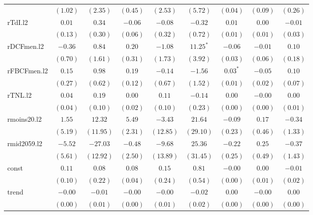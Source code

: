 \documentclass[11pt,]{article}
\begin{document}
\begin{table}[!htbp]
\begin{center}
\begin{tabular}{l c c c c c c c c }
            & $(1.02)$ & $(2.35)$    & $(0.45)$ & $(2.53)$  & $(5.72)$     & $(0.04)$    & $(0.09)$ & $(0.26)$ \\
rTdI.l2     & $0.01$   & $0.34$      & $-0.06$  & $-0.08$   & $-0.32$      & $0.01$      & $0.00$   & $-0.01$  \\
            & $(0.13)$ & $(0.30)$    & $(0.06)$ & $(0.32)$  & $(0.72)$     & $(0.01)$    & $(0.01)$ & $(0.03)$ \\
rDCFmen.l2  & $-0.36$  & $0.84$      & $0.20$   & $-1.08$   & $11.25^{*}$  & $-0.06$     & $-0.01$  & $0.10$   \\
            & $(0.70)$ & $(1.61)$    & $(0.31)$ & $(1.73)$  & $(3.92)$     & $(0.03)$    & $(0.06)$ & $(0.18)$ \\
rFBCFmen.l2 & $0.15$   & $0.98$      & $0.19$   & $-0.14$   & $-1.56$      & $0.03^{*}$  & $-0.05$  & $0.10$   \\
            & $(0.27)$ & $(0.62)$    & $(0.12)$ & $(0.67)$  & $(1.52)$     & $(0.01)$    & $(0.02)$ & $(0.07)$ \\
rTNL.l2     & $0.04$   & $0.19$      & $0.00$   & $0.11$    & $-0.14$      & $0.00$      & $-0.00$  & $0.00$   \\
            & $(0.04)$ & $(0.10)$    & $(0.02)$ & $(0.10)$  & $(0.23)$     & $(0.00)$    & $(0.00)$ & $(0.01)$ \\
rmoins20.l2 & $1.55$   & $12.32$     & $5.49$   & $-3.43$   & $21.64$      & $-0.09$     & $0.17$   & $-0.34$  \\
            & $(5.19)$ & $(11.95)$   & $(2.31)$ & $(12.85)$ & $(29.10)$    & $(0.23)$    & $(0.46)$ & $(1.33)$ \\
rmid2059.l2 & $-5.52$  & $-27.03$    & $-0.48$  & $-9.68$   & $25.36$      & $-0.22$     & $0.25$   & $-0.37$  \\
            & $(5.61)$ & $(12.92)$   & $(2.50)$ & $(13.89)$ & $(31.45)$    & $(0.25)$    & $(0.49)$ & $(1.43)$ \\
const       & $0.11$   & $0.08$      & $0.08$   & $0.15$    & $0.81$       & $-0.00$     & $0.00$   & $-0.01$  \\
            & $(0.10)$ & $(0.22)$    & $(0.04)$ & $(0.24)$  & $(0.54)$     & $(0.00)$    & $(0.01)$ & $(0.02)$ \\
trend       & $-0.00$  & $-0.01$     & $-0.00$  & $-0.00$   & $-0.02$      & $0.00$      & $-0.00$  & $0.00$   \\
            & $(0.00)$ & $(0.01)$    & $(0.00)$ & $(0.01)$  & $(0.02)$     & $(0.00)$    & $(0.00)$ & $(0.00)$ \\

\end{tabular}
\end{center}
\end{table}
\end{document}
